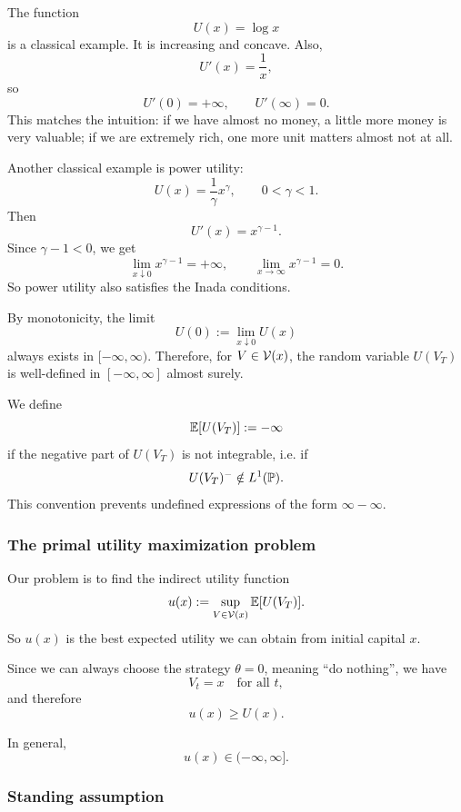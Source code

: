 \begin{primer}
The function
\[
    U(x)=\log x
\]
is a classical example. It is increasing and concave. Also,
\[
    U'(x)=\frac{1}{x},
\]
so
\[
    U'(0)=+\infty,
    \qquad
    U'(\infty)=0.
\]
This matches the intuition: if we have almost no money, a little more money is very valuable; if we are extremely rich, one more unit matters almost not at all.
\end{primer}

\begin{primer}
Another classical example is power utility:
\[
    U(x)=\frac{1}{\gamma}x^\gamma,
    \qquad 0<\gamma<1.
\]
Then
\[
    U'(x)=x^{\gamma-1}.
\]
Since $\gamma-1<0$, we get
\[
    \lim_{x\downarrow 0} x^{\gamma-1}=+\infty,
    \qquad
    \lim_{x\to\infty} x^{\gamma-1}=0.
\]
So power utility also satisfies the Inada conditions.
\end{primer}

\begin{opomba}
By monotonicity, the limit
\[
    U(0):=\lim_{x\downarrow 0}U(x)
\]
always exists in $[-\infty,\infty)$. Therefore, for $V\in\mathcal{V}(x)$, the random variable $U(V_T)$ is well-defined in $[-\infty,\infty]$ almost surely.

We define
\[
    \mathbb{E}[U(V_T)] := -\infty
\]
if the negative part of $U(V_T)$ is not integrable, i.e. if
\[
    U(V_T)^- \notin L^1(\mathbb{P}).
\]
This convention prevents undefined expressions of the form $\infty-\infty$.
\end{opomba}

\subsubsection*{The primal utility maximization problem}

Our problem is to find the indirect utility function
\[
    u(x)
    :=
    \sup_{V\in\mathcal{V}(x)}
    \mathbb{E}[U(V_T)].
\]
So $u(x)$ is the best expected utility we can obtain from initial capital $x$.

Since we can always choose the strategy $\theta=0$, meaning ``do nothing'', we have
\[
    V_t=x
    \quad\text{for all }t,
\]
and therefore
\[
    u(x)\geq U(x).
\]

In general,
\[
    u(x)\in(-\infty,\infty].
\]

\subsubsection*{Standing assumption}

